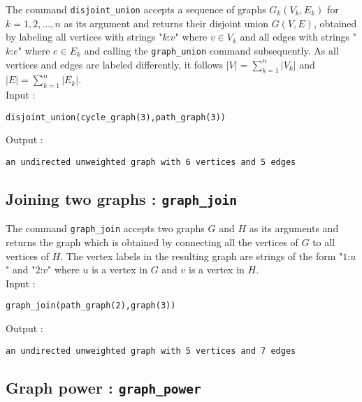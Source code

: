 \documentclass[a4paper,11pt]{article}
\begin{document}
The command {\tt disjoint\_union} accepts a sequence of graphs $ G_k(V_k,E_k) $ for $ k=1,2,\dots,n $ as its argument and returns their disjoint union $ G(V,E) $, obtained by labeling all vertices with strings "$ k $:$ v $" where $ v\in V_k $ and all edges with strings "$ k $:$ e $" where $ e\in E_k $ and calling the {\tt graph\_union} command subsequently. As all vertices and edges are labeled differently, it follows $ |V|=\sum_{k=1}^n|V_k| $ and $ |E|=\sum_{k=1}^n|E_k| $.\\
Input :
\begin{center}
  \tt disjoint\_union(cycle\_graph(3),path\_graph(3))
\end{center}
Output :
\begin{center}
  \tt an undirected unweighted graph with 6 vertices and 5 edges
\end{center}

\subsection{Joining two graphs : {\tt graph\_join}}

The command {\tt graph\_join} accepts two graphs $ G $ and $ H $ as its arguments and returns the graph which is obtained by connecting all the vertices of $ G $ to all vertices of $ H $. The vertex labels in the resulting graph are strings of the form "$ 1 $:$ u $" and "$ 2 $:$ v $" where $ u $ is a vertex in $ G $ and $ v $ is a vertex in $ H $.\\
Input :
\begin{center}
  \tt graph\_join(path\_graph(2),graph(3))
\end{center}
Output :
\begin{center}
  \tt an undirected unweighted graph with 5 vertices and 7 edges
\end{center}

\subsection{Graph power : {\tt graph\_power}}
\end{document}
